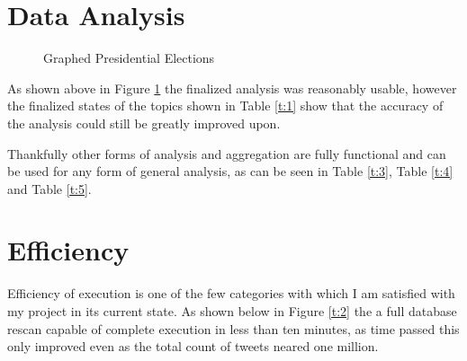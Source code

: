 \documentclass[12pt,a4paper]{report}
\begin{document}
  \section{Data Analysis}
  \begin{figure}[h]
    \centering
    \caption{Graphed Presidential Elections}
    \label{fig:ex}
  \end{figure}
  As shown above in Figure \ref{fig:ex} the finalized analysis was reasonably usable, however the finalized states of the topics shown in Table \ref{t:1} show that the accuracy of the analysis could still be greatly improved upon.
  \par
  Thankfully other forms of analysis and aggregation are fully functional and can be used for any form of general analysis, as can be seen in Table \ref{t:3}, Table \ref{t:4} and Table \ref{t:5}.
  \section{Efficiency}
  Efficiency of execution is one of the few categories with which I am satisfied with my project in its current state. As shown below in Figure \ref{t:2} the a full database rescan capable of complete execution in less than ten minutes, as time passed this only improved even as the total count of tweets neared one million.
\end{document}
